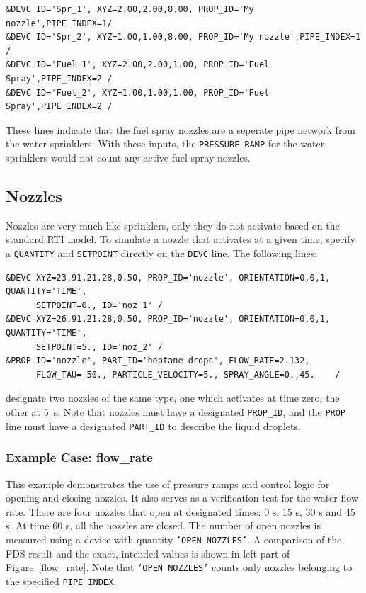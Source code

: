 \documentclass[11pt]{book}
\newcommand{\ct}{\tt\small}
\begin{document}
\footnotesize
\begin{verbatim}
&DEVC ID='Spr_1', XYZ=2.00,2.00,8.00, PROP_ID='My nozzle',PIPE_INDEX=1/
&DEVC ID='Spr_2', XYZ=1.00,1.00,8.00, PROP_ID='My nozzle',PIPE_INDEX=1 /
&DEVC ID='Fuel_1', XYZ=2.00,2.00,1.00, PROP_ID='Fuel Spray',PIPE_INDEX=2 /
&DEVC ID='Fuel_2', XYZ=1.00,1.00,1.00, PROP_ID='Fuel Spray',PIPE_INDEX=2 /
\end{verbatim}
\normalsize

\noindent

These lines indicate that the fuel spray nozzles are a seperate pipe network from the water sprinklers.  With these inputs, the {\ct PRESSURE\_RAMP} for the water sprinklers would not count any active fuel spray nozzles.

\subsection{Nozzles}
\label{info:nozzles}

Nozzles are very much like sprinklers, only they do not activate based on the standard RTI model.
To simulate a nozzle that activates at a given time,
specify a {\ct QUANTITY} and {\ct SETPOINT} directly on the {\ct DEVC} line.
The following lines:

\footnotesize
\begin{verbatim}
&DEVC XYZ=23.91,21.28,0.50, PROP_ID='nozzle', ORIENTATION=0,0,1, QUANTITY='TIME',
      SETPOINT=0., ID='noz_1' /
&DEVC XYZ=26.91,21.28,0.50, PROP_ID='nozzle', ORIENTATION=0,0,1, QUANTITY='TIME',
      SETPOINT=5., ID='noz_2' /
&PROP ID='nozzle', PART_ID='heptane drops', FLOW_RATE=2.132,
      FLOW_TAU=-50., PARTICLE_VELOCITY=5., SPRAY_ANGLE=0.,45.    /
\end{verbatim}
\normalsize

\noindent
designate two nozzles of the same type, one which activates at time zero, the other at 5~s. Note that nozzles must have a designated
{\ct PROP\_ID}, and the {\ct PROP} line must have a designated {\ct PART\_ID} to describe the liquid droplets.

\subsubsection{Example Case: {\bf flow\_rate}}

This example demonstrates the use of pressure ramps and control logic for opening and closing nozzles. It also serves as a verification test for
the water flow rate. There are four nozzles that open at designated times: 0 s, 15 s, 30 s and 45 s. At time 60 s, all the nozzles are closed.
The number of open nozzles is measured using a device with quantity {\ct 'OPEN NOZZLES'}. A comparison of the FDS result and the exact, intended values
is shown in left part of Figure~\ref{flow_rate}.  Note that {\ct 'OPEN NOZZLES'} counts only nozzles belonging to the specified {\ct PIPE\_INDEX}.
\end{document}
